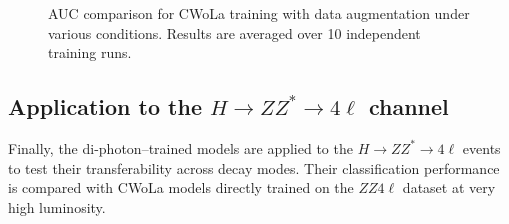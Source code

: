 \documentclass[12pt]{article}
\begin{document}
\begin{figure}[htpb]
{            }
            \caption{AUC comparison for CWoLa training with data augmentation under various conditions. Results are averaged over 10 independent training runs.}
            \label{fig:CWoLa_CNN_ParT_diphoton_w_wo_photon_L_aug}
        \end{figure}


	\subsection{Application to the $H \to ZZ^* \to 4\ell$ channel}%
	\label{sub:apply_di_photon_models_on_zz4l_events}
		Finally, the di-photon–trained models are applied to the $H \to ZZ^* \to 4\ell$ events to test their transferability across decay modes. Their classification performance is compared with CWoLa models directly trained on the $ZZ4\ell$ dataset at very high luminosity.
\end{document}
